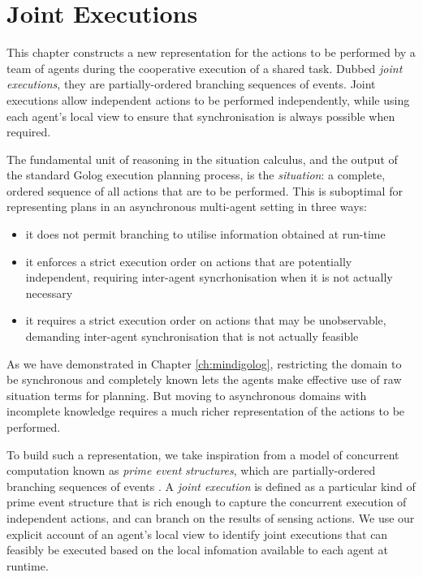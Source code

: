 

\chapter{Joint Executions}

\label{ch:jointexec}

This chapter constructs a new representation for the actions to be
performed by a team of agents during the cooperative execution of
a shared task. Dubbed \emph{joint executions}, they are partially-ordered
branching sequences of events. Joint executions allow independent
actions to be performed independently, while using each agent's local
view to ensure that synchronisation is always possible when required. 

The fundamental unit of reasoning in the situation calculus, and the
output of the standard Golog execution planning process, is the \emph{situation}:
a complete, ordered sequence of all actions that are to be performed.
This is suboptimal for representing plans in an asynchronous multi-agent
setting in three ways:

\begin{itemize}
\item it does not permit branching to utilise information obtained at run-time 
\item it enforces a strict execution order on actions that are potentially
independent, requiring inter-agent syncrhonisation when it is not
actually necessary 
\item it requires a strict execution order on actions that may be unobservable,
demanding inter-agent synchronisation that is not actually feasible 
\end{itemize}
As we have demonstrated in Chapter \ref{ch:mindigolog}, restricting
the domain to be synchronous and completely known lets the agents
make effective use of raw situation terms for planning. But moving
to asynchronous domains with incomplete knowledge requires a much
richer representation of the actions to be performed.

To build such a representation, we take inspiration from a model of
concurrent computation known as \emph{prime event} \emph{structures},
which are partially-ordered branching sequences of events \citep{npw79event_structures}.
A \emph{joint execution} is defined as a particular kind of prime
event structure that is rich enough to capture the concurrent execution
of independent actions, and can branch on the results of sensing actions.
We use our explicit account of an agent's local view to identify joint
executions that can feasibly be executed based on the local infomation
available to each agent at runtime.

